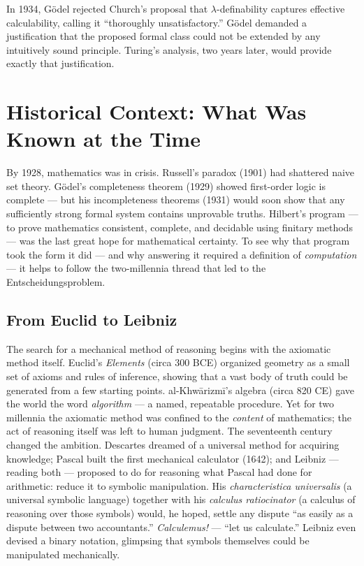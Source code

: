 In 1934, G\"odel rejected Church's proposal that $\lambda$-definability captures effective calculability, calling it ``thoroughly unsatisfactory.'' G\"odel demanded a justification that the proposed formal class could not be extended by any intuitively sound principle. Turing's analysis, two years later, would provide exactly that justification.

\section{Historical Context: What Was Known at the Time}
\label{sec:computation:context}

By 1928, mathematics was in crisis. Russell's paradox (1901) had shattered naive set theory. G\"odel's completeness theorem (1929) showed first-order logic is complete --- but his incompleteness theorems (1931) would soon show that any sufficiently strong formal system contains unprovable truths. Hilbert's program --- to prove mathematics consistent, complete, and decidable using finitary methods --- was the last great hope for mathematical certainty. To see why that program took the form it did --- and why answering it required a definition of \emph{computation} --- it helps to follow the two-millennia thread that led to the Entscheidungsproblem.

\subsection{From Euclid to Leibniz}
\label{sec:computation:euclid_to_leibniz}

The search for a mechanical method of reasoning begins with the axiomatic method itself. Euclid's \emph{Elements} (circa 300 BCE) organized geometry as a small set of axioms and rules of inference, showing that a vast body of truth could be generated from a few starting points. al-Khw\=arizm\=i's algebra (circa 820 CE) gave the world the word \emph{algorithm} --- a named, repeatable procedure. Yet for two millennia the axiomatic method was confined to the \emph{content} of mathematics; the act of reasoning itself was left to human judgment. The seventeenth century changed the ambition. Descartes dreamed of a universal method for acquiring knowledge; Pascal built the first mechanical calculator (1642); and Leibniz --- reading both --- proposed to do for reasoning what Pascal had done for arithmetic: reduce it to symbolic manipulation. His \emph{characteristica universalis} (a universal symbolic language) together with his \emph{calculus ratiocinator} (a calculus of reasoning over those symbols) would, he hoped, settle any dispute ``as easily as a dispute between two accountants.'' \emph{Calculemus!} --- ``let us calculate.'' Leibniz even devised a binary notation, glimpsing that symbols themselves could be manipulated mechanically.

